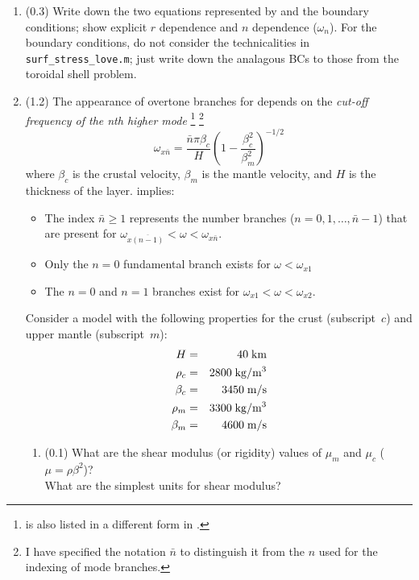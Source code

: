 \documentclass[11pt,titlepage,fleqn]{article}
\newcommand{\cutoff}[1]{{#1}_{x\bar{n}}}
\begin{document}
\begin{enumerate}

\item (0.3) Write down the two equations represented by  and the boundary conditions; show explicit $r$ dependence and $n$ dependence (\eg $\omega_n$). For the boundary conditions, do not consider the technicalities in \verb+surf_stress_love.m+; just write down the analagous BCs to those from the toroidal shell problem.


\item (1.2) The appearance of overtone branches for  depends on the {\em cut-off frequency of the nth higher mode} \citep[][Eq. 7.8]{AkiRichardsE2}
\footnote{ is also listed in a different form in \citet[][p. 92]{SteinWysession}.}
\footnote{I have specified the notation $\bar{n}$ to distinguish it from the $n$ used for the indexing of mode branches.}
%
\begin{equation}
\cutoff{\omega} = \frac{\bar{n}\pi \beta_c}{H} \left( 1 - \frac{\beta_c^2}{\beta_m^2}\right)^{-1/2}
\label{wcn}
\end{equation}
%
where $\beta_c$ is the crustal velocity, $\beta_m$ is the mantle velocity, and $H$ is the thickness of the layer.  implies:
%
\begin{itemize}
\item The index $\bar{n} \ge 1$ represents the number branches ($n = 0, 1, \ldots, \bar{n}-1$) that are present for $\omega_{x\overline{(n-1)}} < \omega < \omega_{x\bar{n}}$.
\item Only the $n=0$ fundamental branch exists for $\omega < \omega_{x1}$
\item The $n=0$ and $n=1$ branches exist for $\omega_{x1} < \omega < \omega_{x2}$.
\end{itemize}

Consider a model with the following properties for the crust (subscript~$c$) and upper mantle (subscript~$m$):
%
\begin{eqnarray*}
H &=& 40\;{\rm km}
\\
\rho_c &=& 2800 \;{\rm kg/m^3}
\\
\beta_c &=& 3450 \;{\rm m/s}
\\
\rho_m &=& 3300 \;{\rm kg/m^3}
\\
\beta_m &=& 4600 \;{\rm m/s}
\end{eqnarray*}

\begin{enumerate}
\item (0.1) What are the shear modulus (or rigidity) values of $\mu_m$ and $\mu_c$ ($\mu = \rho\beta^2$)? \\
What are the simplest units for shear modulus?


\end{enumerate}
\end{enumerate}
\end{document}
